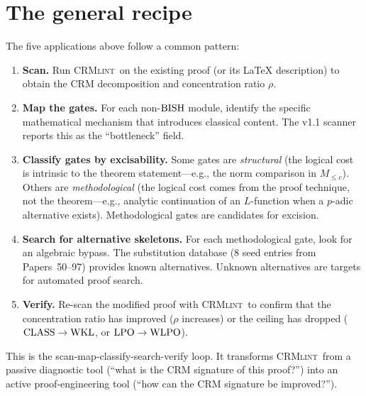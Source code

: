 \documentclass[11pt,a4paper]{article}
\theoremstyle{plain}
\theoremstyle{definition}
\newcommand{\BISH}{\textup{BISH}}
\newcommand{\WKL}{\textup{WKL}}
\newcommand{\WLPO}{\textup{WLPO}}
\newcommand{\LPO}{\textup{LPO}}
\newcommand{\CLASS}{\textup{CLASS}}
\newcommand{\CRMlint}{\textsc{CRMlint}}
\begin{document}
\section{The general recipe}\label{sec:recipe}

The five applications above follow a common pattern:

\begin{enumerate}[label=\textbf{Step \arabic*.}]
\item \textbf{Scan.}
  Run \CRMlint\ on the existing proof (or its LaTeX description) to
  obtain the CRM decomposition and concentration ratio $\rho$.

\item \textbf{Map the gates.}
  For each non-$\BISH$ module, identify the specific mathematical
  mechanism that introduces classical content.  The v1.1 scanner
  reports this as the ``bottleneck'' field.

\item \textbf{Classify gates by excisability.}
  Some gates are \emph{structural} (the logical cost is intrinsic to
  the theorem statement---e.g., the norm comparison in $M_{\leq c}$).
  Others are \emph{methodological} (the logical cost comes from the
  proof technique, not the theorem---e.g., analytic continuation of
  an $L$-function when a $p$-adic alternative exists).  Methodological
  gates are candidates for excision.

\item \textbf{Search for alternative skeletons.}
  For each methodological gate, look for an algebraic bypass.  The
  substitution database (8 seed entries from Papers~50--97) provides
  known alternatives.  Unknown alternatives are targets for automated
  proof search.

\item \textbf{Verify.}
  Re-scan the modified proof with \CRMlint\ to confirm that the
  concentration ratio has improved ($\rho$ increases) or the ceiling
  has dropped ($\CLASS \to \WKL$, or $\LPO \to \WLPO$).
\end{enumerate}

This is the scan-map-classify-search-verify loop.  It transforms
\CRMlint\ from a passive diagnostic tool (``what is the CRM
signature of this proof?'') into an active proof-engineering tool
(``how can the CRM signature be improved?'').
\end{document}
